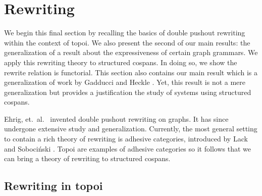 \documentclass{amsart}
\theoremstyle{remark}
\theoremstyle{definition}
\begin{document}

\section{Rewriting}
\label{sec:rewriting}

We begin this final section by recalling the basics of
double pushout rewriting within the context of topoi. We
also present the second of our main results: the
generalization of a result about the expressiveness of
certain graph grammars. We apply this rewriting theory to
structured cospans. In doing so, we show the rewrite
relation is functorial. This section also contains our main
result which is a generalization of work by Gadducci and
Heckle \cite{Gadd_IndGraphTrans}.  Yet, this result is not a
mere generalization but provides a justification the study
of systems using structured cospans.

Ehrig, et.\ al.\ \cite{Ehrig_GraphGram} invented double pushout rewriting on graphs. It has since undergone
extensive study and generalization. Currently, the most
general setting to contain a rich theory of rewriting is
adhesive categories, introduced by Lack and Soboci\'{n}ski
\cite{LackSobo_Adhesive}. Topoi are examples of adhesive
categories \cite{LackSobo_ToposIsAdh} so it follows that we
can bring a theory of rewriting to structured cospans.


\subsection{Rewriting in topoi}
\label{sec:Adhesive-Rewriting}
\end{document}
